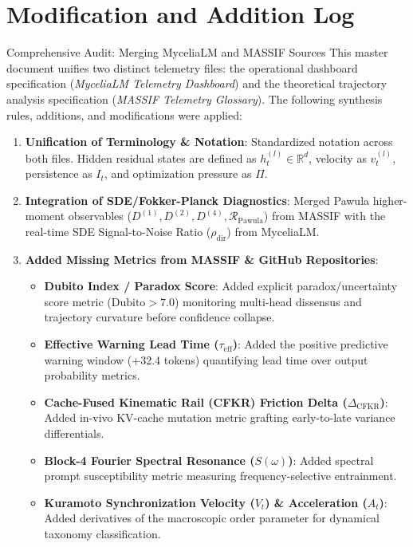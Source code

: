 \documentclass[10pt,a4paper]{article}
\begin{document}
\section{Modification and Addition Log}
\begin{logbox}{Comprehensive Audit: Merging MyceliaLM and MASSIF Sources}
This master document unifies two distinct telemetry files: the operational dashboard specification (\emph{MyceliaLM Telemetry Dashboard}) and the theoretical trajectory analysis specification (\emph{MASSIF Telemetry Glossary}). The following synthesis rules, additions, and modifications were applied:

\begin{enumerate}[leftmargin=*]
    \item \textbf{Unification of Terminology \& Notation}: Standardized notation across both files. Hidden residual states are defined as $h_t^{(l)} \in \mathbb{R}^d$, velocity as $v_t^{(l)}$, persistence as $I_t$, and optimization pressure as $\Pi$.
    \item \textbf{Integration of SDE/Fokker-Planck Diagnostics}: Merged Pawula higher-moment observables ($D^{(1)}, D^{(2)}, D^{(4)}, \mathcal{R}_{\text{Pawula}}$) from MASSIF with the real-time SDE Signal-to-Noise Ratio ($\rho_{\text{dir}}$) from MyceliaLM.
    \item \textbf{Added Missing Metrics from MASSIF \& GitHub Repositories}:
    \begin{itemize}
        \item \textbf{Dubito Index / Paradox Score}: Added explicit paradox/uncertainty score metric ($\text{Dubito} > 7.0$) monitoring multi-head dissensus and trajectory curvature before confidence collapse.
        \item \textbf{Effective Warning Lead Time ($\tau_{\text{eff}}$)}: Added the positive predictive warning window (+32.4 tokens) quantifying lead time over output probability metrics.
        \item \textbf{Cache-Fused Kinematic Rail (CFKR) Friction Delta ($\Delta_{\text{CFKR}}$)}: Added in-vivo KV-cache mutation metric grafting early-to-late variance differentials.
        \item \textbf{Block-4 Fourier Spectral Resonance ($S(\omega)$)}: Added spectral prompt susceptibility metric measuring frequency-selective entrainment.
        \item \textbf{Kuramoto Synchronization Velocity ($V_t$) \& Acceleration ($A_t$)}: Added derivatives of the macroscopic order parameter for dynamical taxonomy classification.

\end{itemize}
\end{enumerate}
\end{logbox}
\end{document}

